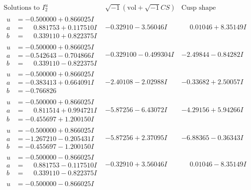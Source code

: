 \documentclass[1p]{elsarticle_modified}
\theoremstyle{definition}
\newcommand{\I}{\sqrt{-1}}
\begin{document}
$$\begin{array}{c|c|c}  
\text{Solutions to }I^u_{2}& \I (\text{vol} + \sqrt{-1}CS) & \text{Cusp shape}\\
 \hline 
\begin{aligned}
u &= -0.500000 + 0.866025 I \\
a &= \phantom{-}0.881753 + 0.117510 I \\
b &= \phantom{-}0.339110 + 0.822375 I\end{aligned}
 & -0.32910 - 3.56046 I & \phantom{-}0.01046 + 8.35149 I \\ \hline\begin{aligned}
u &= -0.500000 + 0.866025 I \\
a &= -0.542643 - 0.704866 I \\
b &= \phantom{-}0.339110 - 0.822375 I\end{aligned}
 & -0.329100 - 0.499304 I & -2.49844 - 0.84282 I \\ \hline\begin{aligned}
u &= -0.500000 + 0.866025 I \\
a &= -0.383413 + 0.664091 I \\
b &= -0.766826\phantom{ +0.000000I}\end{aligned}
 & -2.40108 - 2.02988 I & -0.33682 + 2.50057 I \\ \hline\begin{aligned}
u &= -0.500000 + 0.866025 I \\
a &= \phantom{-}0.811514 + 0.994721 I \\
b &= -0.455697 + 1.200150 I\end{aligned}
 & -5.87256 - 6.43072 I & -4.29156 + 5.94266 I \\ \hline\begin{aligned}
u &= -0.500000 + 0.866025 I \\
a &= -1.267210 - 0.205431 I \\
b &= -0.455697 - 1.200150 I\end{aligned}
 & -5.87256 + 2.37095 I & -6.88365 - 0.36343 I \\ \hline\begin{aligned}
u &= -0.500000 - 0.866025 I \\
a &= \phantom{-}0.881753 - 0.117510 I \\
b &= \phantom{-}0.339110 - 0.822375 I\end{aligned}
 & -0.32910 + 3.56046 I & \phantom{-}0.01046 - 8.35149 I \\ \hline\begin{aligned}
u &= -0.500000 - 0.866025 I \\

\end{aligned}
\end{array}$$
\end{document}
